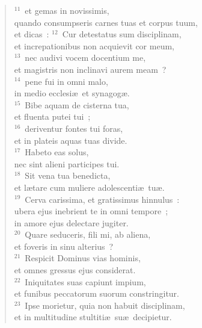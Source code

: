 \begin{flushleft}
\begin{verse}
${}^{11}$~et gemas in novissimis,\\ quando consumpseris carnes tuas et corpus tuum,\\ et dicas~:
${}^{12}$~Cur detestatus sum disciplinam,\\ et increpationibus non acquievit cor meum,\\
${}^{13}$~nec audivi vocem docentium me,\\ et magistris non inclinavi aurem meam~?\\
${}^{14}$~pene fui in omni malo,\\ in medio ecclesi\ae\ et synagog\ae .\\
${}^{15}$~Bibe aquam de cisterna tua,\\ et fluenta putei tui~;\\
${}^{16}$~deriventur fontes tui foras,\\ et in plateis aquas tuas divide.\\
${}^{17}$~Habeto eas solus,\\ nec sint alieni participes tui.\\
${}^{18}$~Sit vena tua benedicta,\\ et l\ae tare cum muliere adolescenti\ae\ tu\ae .\\
${}^{19}$~Cerva carissima, et gratissimus hinnulus~:\\ ubera ejus inebrient te in omni tempore~;\\ in amore ejus delectare jugiter.\\
${}^{20}$~Quare seduceris, fili mi, ab aliena,\\ et foveris in sinu alterius~?\\
${}^{21}$~Respicit Dominus vias hominis,\\ et omnes gressus ejus considerat.\\
${}^{22}$~Iniquitates suas capiunt impium,\\ et funibus peccatorum suorum constringitur.\\
${}^{23}$~Ipse morietur, quia non habuit disciplinam,\\ et in multitudine stultiti\ae\ su\ae\ decipietur.\end{verse}\end{flushleft}


